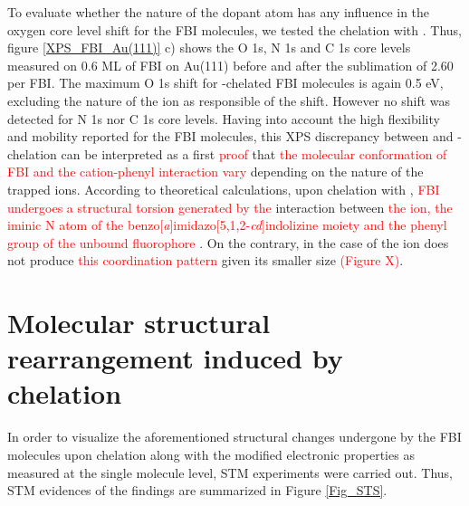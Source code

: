 \documentclass[aps,prl,reprint,longbibliography,superscriptaddress, english]{revtex4-1}
\begin{document}
To evaluate whether the nature of the dopant atom has any influence in the oxygen core level shift for the FBI molecules, we tested the chelation with \Nap. Thus, figure \ref{XPS_FBI_Au(111)} c) shows the O 1s, N 1s and C 1s core levels measured on 0.6 ML of FBI on Au(111) before and after the sublimation of 2.60 \Nap per FBI. The maximum O 1s shift for \Nap-chelated FBI molecules is again 0.5 eV, excluding the nature of the ion as responsible of the shift. However no shift was detected for N 1s nor C 1s core levels. Having into account the high flexibility and mobility reported for the FBI molecules, this XPS discrepancy between \Bapp\- and \Nap-chelation can be interpreted as a first \textcolor{red}{proof} that \textcolor{red}{the molecular conformation of FBI and the cation-phenyl interaction vary} depending on the nature of the trapped ions. According to theoretical calculations, upon chelation with \Bapp, \textcolor{red}{FBI undergoes a structural torsion generated by the} interaction between \textcolor{red}{the ion, the iminic N atom of the benzo[\textit{a}]imidazo[5,1,2-\textit{cd}]indolizine moiety and the phenyl group of the unbound fluorophore} \cite{rivilla_fluorescent_2020}. On the contrary, in the case of \Nap the ion does not produce \textcolor{red}{this coordination pattern}  given its smaller size \textcolor{red}{(Figure X)}. 



\section{Molecular structural rearrangement induced by chelation}

In order to visualize the aforementioned structural changes undergone by the FBI molecules upon chelation along with the modified electronic properties as measured at the single molecule level, STM experiments were carried out. Thus, STM evidences of the findings are summarized in Figure \ref{Fig_STS}. 
\end{document}
